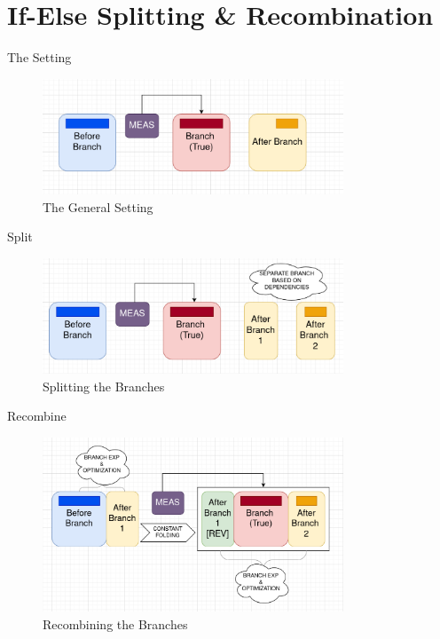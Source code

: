 \documentclass[10pt]{beamer}
\begin{document}

\section{If-Else Splitting \& Recombination}

\begin{frame}{The Setting}
  \begin{figure}
    \centering
    \includegraphics[width=0.8\textwidth]{Images/start.png}
    \caption{The General Setting}
  \end{figure}
\end{frame}

\begin{frame}{Split}
  \begin{figure}
    \centering
    \includegraphics[width=0.8\textwidth]{Images/sep.png}
    \caption{Splitting the Branches}
  \end{figure}
\end{frame}

\begin{frame}{Recombine}
  \begin{figure}
    \centering
    \includegraphics[width=0.8\textwidth]{Images/recomb.png}
    \caption{Recombining the Branches}
  \end{figure}
\end{frame}
\end{document}
